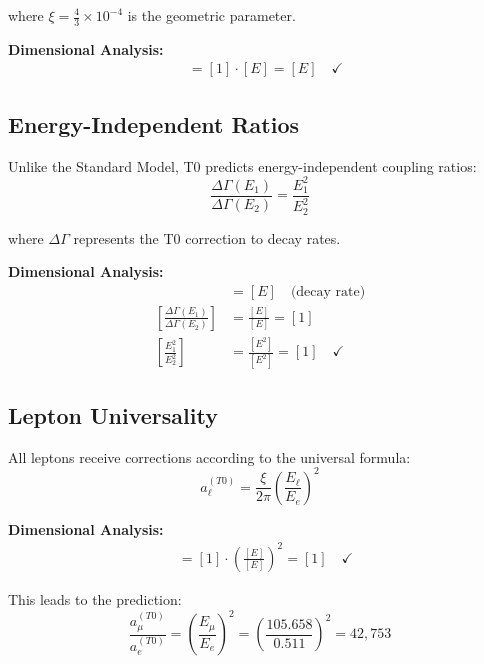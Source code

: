 \documentclass[12pt,a4paper]{report}
\begin{document}
	where $\xi = \frac{4}{3} \times 10^{-4}$ is the geometric parameter.
	
	\textbf{Dimensional Analysis:}
	\begin{align}
		[\Delta E^{(T0)}] &= [1] \cdot [E] = [E] \quad \checkmark
	\end{align}
	
	\subsection{Energy-Independent Ratios}
	\label{subsec:energy_independent_ratios}
	
	Unlike the Standard Model, T0 predicts energy-independent coupling ratios:
	\begin{equation}
		\frac{\Delta\Gamma(E_1)}{\Delta\Gamma(E_2)} = \frac{E_1^2}{E_2^2}
	\end{equation}
	
	where $\Delta\Gamma$ represents the T0 correction to decay rates.
	
	\textbf{Dimensional Analysis:}
	\begin{align}
		[\Delta\Gamma] &= [E] \quad \text{(decay rate)} \\
		\left[\frac{\Delta\Gamma(E_1)}{\Delta\Gamma(E_2)}\right] &= \frac{[E]}{[E]} = [1] \\
		\left[\frac{E_1^2}{E_2^2}\right] &= \frac{[E^2]}{[E^2]} = [1] \quad \checkmark
	\end{align}
	
	\subsection{Lepton Universality}
	\label{subsec:lepton_universality}
	
	All leptons receive corrections according to the universal formula:
	\begin{equation}
		a_\ell^{(T0)} = \frac{\xi}{2\pi} \left(\frac{E_\ell}{E_e}\right)^2
	\end{equation}
	
	\textbf{Dimensional Analysis:}
	\begin{align}
		[a_\ell^{(T0)}] &= [1] \cdot \left(\frac{[E]}{[E]}\right)^2 = [1] \quad \checkmark
	\end{align}
	
	This leads to the prediction:
	\begin{equation}
		\frac{a_\mu^{(T0)}}{a_e^{(T0)}} = \left(\frac{E_\mu}{E_e}\right)^2 = \left(\frac{105.658}{0.511}\right)^2 = 42,753
	\end{equation}
	
\end{document}
